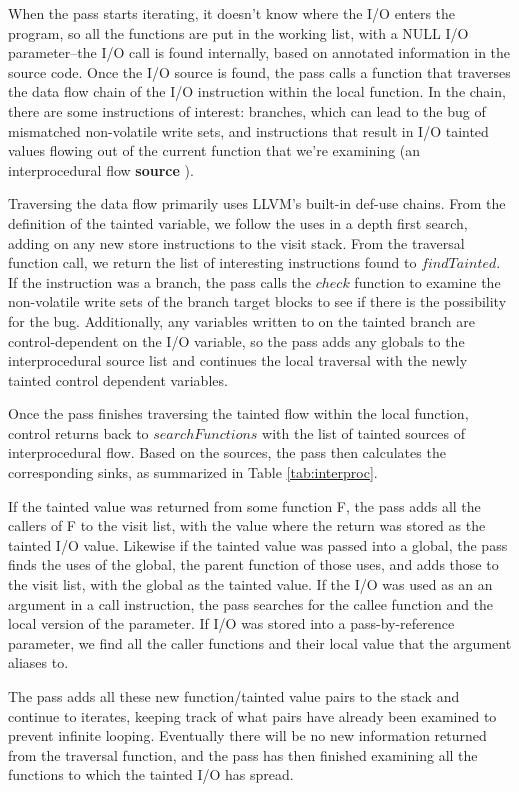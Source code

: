 When the pass starts iterating, it doesn't know where the I/O enters the program, so all the functions are put in the working list, with a NULL I/O parameter--the I/O call is found internally, based on annotated information in the source code. Once the I/O source is found, the pass calls a function that traverses the data flow chain of the I/O instruction within the local function. In the chain, there are some instructions of interest: branches, which can lead to the bug of mismatched non-volatile write sets, and instructions that result in I/O tainted values flowing out of the current function that we're examining (an interprocedural flow {\bf source} ). 
	
Traversing the data flow primarily uses LLVM's built-in def-use chains. From the definition of the tainted variable, we follow the uses in a depth first search, adding on any new store instructions to the visit stack. 
From the traversal function call, we return the list of interesting instructions found to $findTainted$. If the instruction was a branch, the pass calls the $check$ function to examine the non-volatile write sets of the branch target blocks to see if there is the possibility for the bug. Additionally, any variables written to on the tainted branch are control-dependent on the I/O variable, so the pass adds any globals to the interprocedural source list and continues the local traversal with the newly tainted control dependent variables.

Once the pass finishes traversing the tainted flow within the local function, control returns back to $searchFunctions$ with the list of tainted sources of interprocedural flow. Based on the sources, the pass then calculates the corresponding sinks, as summarized in Table \ref{tab:interproc}.
	
If the tainted value was returned from some function F, the pass adds all the callers of F to the visit list, with the value where the return was stored as the tainted I/O value. Likewise if the tainted value was passed into a global, the pass finds the uses of the global, the parent function of those uses, and adds those to the visit list, with the global as the tainted value. If the I/O was used as an an argument in a call instruction, the pass searches for the callee function and the local version of the parameter. If I/O was stored into a pass-by-reference parameter, we find all the caller functions and their local value that the argument aliases to. 
	
The pass adds all these new function/tainted value pairs to the stack and continue to iterates, keeping track of what pairs have already been examined to prevent infinite looping. Eventually there will be no new information returned from the traversal function, and the pass has then finished examining all the functions to which the tainted I/O has spread. 

